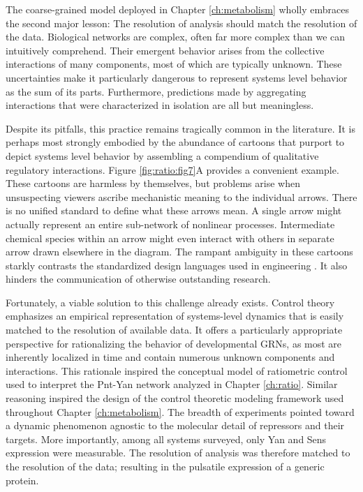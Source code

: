 The coarse-grained model deployed in Chapter \ref{ch:metabolism} wholly embraces the second major lesson: The resolution of analysis should match the resolution of the data. Biological networks are complex, often far more complex than we can intuitively comprehend. Their emergent behavior arises from the collective interactions of many components, most of which are typically unknown. These uncertainties make it particularly dangerous to represent systems level behavior as the sum of its parts. Furthermore, predictions made by aggregating interactions that were characterized in isolation are all but meaningless.

Despite its pitfalls, this practice remains tragically common in the literature. It is perhaps most strongly embodied by the abundance of cartoons that purport to depict systems level behavior by assembling a compendium of qualitative regulatory interactions. Figure \ref{fig:ratio:fig7}A provides a convenient example. These cartoons are harmless by themselves, but problems arise when unsuspecting viewers ascribe mechanistic meaning to the individual arrows. There is no unified standard to define what these arrows mean. A single arrow might actually represent an entire sub-network of nonlinear processes. Intermediate chemical species within an arrow might even interact with others in separate arrow drawn elsewhere in the diagram. The rampant ambiguity in these cartoons starkly contrasts the standardized design languages used in engineering \cite{Lazebnik2004}. It also hinders the communication of otherwise outstanding research.

Fortunately, a viable solution to this challenge already exists. Control theory emphasizes an empirical representation of systems-level dynamics that is easily matched to the resolution of available data. It offers a particularly appropriate perspective for rationalizing the behavior of developmental GRNs, as most are inherently localized in time and contain numerous unknown components and interactions. This rationale inspired the conceptual model of ratiometric control used to interpret the Pnt-Yan network analyzed in Chapter \ref{ch:ratio}. Similar reasoning inspired the design of the control theoretic modeling framework used throughout Chapter \ref{ch:metabolism}. The breadth of experiments pointed toward a dynamic phenomenon agnostic to the molecular detail of repressors and their targets. More importantly, among all systems surveyed, only Yan and Sens expression were measurable. The resolution of analysis was therefore matched to the resolution of the data; resulting in the pulsatile expression of a generic protein.

